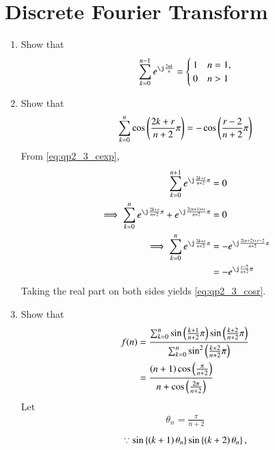 \documentclass[journal,12pt,twocolumn]{IEEEtran}
\renewcommand\thesection{\arabic{section}}
\begin{document}
\section{Discrete Fourier Transform}
\begin{enumerate}[label=\thesection.\arabic*
,ref=\thesection.\theenumi]
\item Show that 
\begin{align}
\label{eq:qp2_3_cexp}
\sum_{k=0}^{n-1}e^{\j \frac{2 \pi k}{n}} 
= 
\begin{cases}
1 & n = 1,
\\
0 & n > 1
\end{cases}
\end{align}
\item Show that 
%
\begin{align}
\label{eq:qp2_3_cosr}
\sum_{k=0}^{n}\cos \left(\frac{2k+r}{n+2}\pi\right) = -\cos\left(\frac{r-2}{n+2}\pi\right) 
\end{align}
\solution From \eqref{eq:qp2_3_cexp},
\begin{align}
\label{eq:qp2_3_cosr_sol}
\sum_{k=0}^{n+1}e^{\j \frac{2k+r}{n+2}\pi} &=0
\nonumber \\
\implies \sum_{k=0}^{n}e^{\j \frac{2k+r}{n+2}\pi} + e^{\j \frac{2\brak{n+1}+r}{n+2}\pi} &=0
\nonumber \\
\implies \sum_{k=0}^{n}e^{\j \frac{2k+r}{n+2}\pi} &=  -e^{\j \frac{2\brak{n+2}+r-2}{n+2}\pi} 
\nonumber \\
&=-e^{\j \frac{r-2}{n+2}\pi} 
\end{align}
Taking the real part on both sides yields \eqref{eq:qp2_3_cosr}.
%
\item Show that 
\begin{align}
\label{eq:qp2_3_sum}
f(n) & = \frac{\sum_{k=0}^{n}\sin\left(\frac{k+1}{n+2}\pi\right)
\sin\left(\frac{k+2}{n+2}\pi\right) }{\sum_{k=0}^{n}\sin^2\left(\frac{k+2}{n+2}\pi\right)}
\\
& = 
\frac{\left(n+1\right)\cos \left(\frac{\pi}{n+2}\right)}{n+\cos\left(\frac{2\pi}{n+2}\right)}
\label{eq:qp2_3_sum_ans}
\end{align}
\solution 
Let
\begin{align}
\label{eq:qp2_3_theta}
\theta_n = \frac{\pi}{n+2}
\end{align}
%
\begin{multline}
\label{eq:qp2_3_cos}
\because \sin\cbrak{\brak{k+1}\theta_n}
\sin\cbrak{\brak{k+2}\theta_n} ,
\\

\end{multline}
\end{enumerate}
\end{document}
